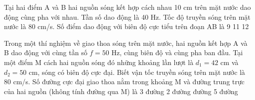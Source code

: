 \setcounter{paragraph}{0}
\PhanI
{}
\begin{ex}%
Tại hai điểm A và B hai nguồn sóng kết hợp cách nhau 10 cm trên mặt nước dao động cùng pha với nhau. Tần số dao động là 40 Hz. Tốc độ truyền sóng trên mặt nước là 80 cm/s. Số điểm dao động với biên độ cực tiểu trên đoạn AB là
\choice
{9}
{11}
{}
{12}
\end{ex} 
\begin{ex}%
Trong một thí nghiệm về giao thoa sóng trên mặt nước, hai nguồn kết hợp A và B dao động với cùng tần số $f=50$ Hz, cùng biên độ và cùng pha ban đầu. Tại một điểm M cách hai nguồn sóng đó những khoảng lần lượt là $d_1=42$ cm và $d_2=50$ cm, sóng có biên độ cực đại. Biết vận tốc truyền sóng trên mặt nước là 80 cm/s. Số đường cực đại giao thoa nằm trong khoảng M và đường trung trực của hai nguồn (không tính đường qua M) là
\choice
{3 đường}
{2 đường}
{ đường}
{5 đường}
\end{ex} 
 
